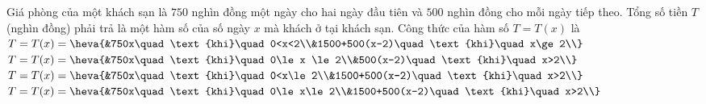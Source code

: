 \begin{ex}%
	Giá phòng của một khách sạn là $750$ nghìn đồng một ngày cho hai ngày đầu tiên và $500$ nghìn đồng cho mỗi ngày tiếp theo. Tổng số tiền $T$ (nghìn đồng) phải trả là một hàm số của số ngày $x$ mà khách ở tại khách sạn. Công thức của hàm số $T=T(x)$ là
	\choice
	{$T=T(x)=\heva{&750x\quad\text{khi}\quad 0<x<2\\&1500+500(x-2)\quad\text{khi}\quad x\ge 2\\}$}
	{$T=T(x)=\heva{&750x\quad\text{khi}\quad 0\le x \le 2\\&500(x-2)\quad\text{khi}\quad x>2\\}$}	
	{\True $T=T(x)=\heva{&750x\quad\text{khi}\quad 0<x\le 2\\&1500+500(x-2)\quad\text{khi}\quad x>2\\}$}
	{$T=T(x)=\heva{&750x\quad\text{khi}\quad 0\le x\le 2\\&1500+500(x-2)\quad\text{khi}\quad x>2\\}$}
\end{ex}
